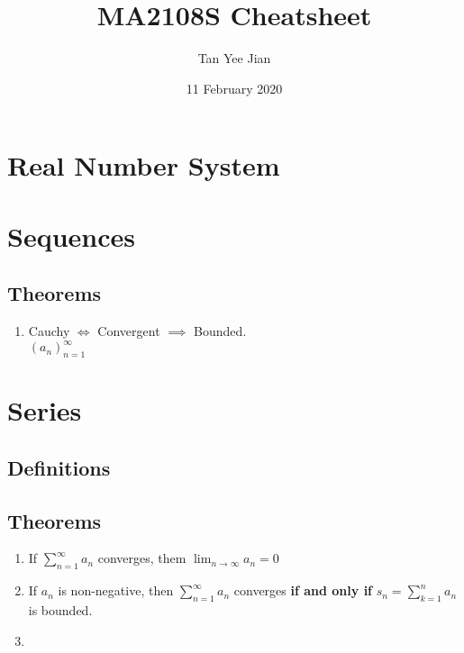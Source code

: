 \documentclass[12pt, a4paper]{article}
\title{MA2108S Cheatsheet}
\author{Tan Yee Jian}
\date{11 February 2020}
\begin{document}
  \maketitle
  \section{Real Number System}
  \section{Sequences}
  \subsection{Theorems}
  \begin{enumerate}
    \item{Cauchy $\iff$ Convergent $\implies$ Bounded}.\\
      $(a_n)_{n=1}^{\infty}$
  \end{enumerate}
  \section{Series}
    \subsection{Definitions}
    \subsection{Theorems}
    \begin{enumerate}
      \item{If $\sum\limits_{n=1}^{\infty}{a_n} $ converges, them $\lim_{n \to \infty} a_n  = 0$}
      \item{If $a_n$ is non-negative, then
          $\sum\limits_{n=1}^{\infty}{a_n}$ converges \textbf{if and only if }
          $s_n = \sum\limits_{k=1}^{n}{a_n}$ is bounded.}
      \item{}
    \end{enumerate}
\end{document}
